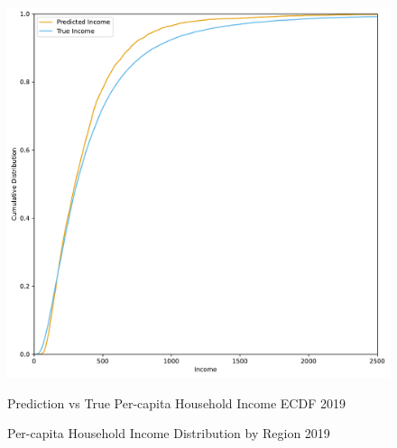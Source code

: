 \begin{figure}[H]
    \centering
    \caption{Prediction vs True Per-capita Household Income ECDF 2019}
    \includegraphics[width=1\textwidth]{../figures/fig1b_prediction_vs_true_income_ecdf_lasso_training_weighted.pdf}
    \label{fig:enter-label}
\end{figure}



\begin{figure}[H]
    \centering
    \caption{Per-capita Household Income Distribution by Region 2019}
    \label{fig:enter-label}
\end{figure}


